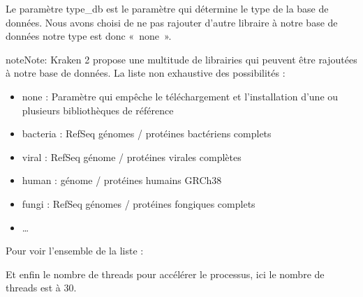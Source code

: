 \documentclass[letterpaper,10pt,french]{sphinxmanual}
\begin{document}
Le paramètre \sphinxhyphen{}type\_db est le paramètre qui détermine le type de la base de données. Nous avons choisi de ne pas rajouter d’autre libraire à notre base de données notre type est donc « none ».

\begin{sphinxadmonition}{note}{Note:}
Kraken 2 propose une multitude de librairies qui peuvent être rajoutées à notre base de données. La liste non exhaustive des possibilités :
\begin{itemize}
\item {} 
none : Paramètre qui empêche le téléchargement et l’installation d’une ou plusieurs bibliothèques de référence

\item {} 
bacteria : RefSeq génomes / protéines bactériens complets

\item {} 
viral : RefSeq génome / protéines virales complètes

\item {} 
human : génome / protéines humains GRCh38

\item {} 
fungi : RefSeq génomes / protéines fongiques complets

\item {} 
…

\end{itemize}
\end{sphinxadmonition}




Pour voir l’ensemble de la liste : 



Et enfin le nombre de threads pour accélérer le processus, ici le nombre de threads est à 30.
\end{document}
